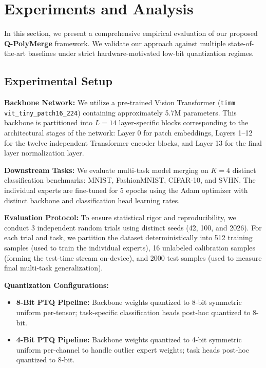 \section{Experiments and Analysis}
\label{sec:experiments}

In this section, we present a comprehensive empirical evaluation of our proposed \textbf{Q-PolyMerge} framework. We validate our approach against multiple state-of-the-art baselines under strict hardware-motivated low-bit quantization regimes.

\subsection{Experimental Setup}
\label{subsec:exp_setup}

\textbf{Backbone Network:} We utilize a pre-trained Vision Transformer (\texttt{timm} \texttt{vit\_tiny\_patch16\_224}) \cite{vaswani2017attention} containing approximately 5.7M parameters. This backbone is partitioned into $L=14$ layer-specific blocks corresponding to the architectural stages of the network: Layer 0 for patch embeddings, Layers 1--12 for the twelve independent Transformer encoder blocks, and Layer 13 for the final layer normalization layer.

\textbf{Downstream Tasks:} We evaluate multi-task model merging on $K=4$ distinct classification benchmarks: MNIST, FashionMNIST, CIFAR-10, and SVHN. The individual experts are fine-tuned for 5 epochs using the Adam optimizer with distinct backbone and classification head learning rates.

\textbf{Evaluation Protocol:} To ensure statistical rigor and reproducibility, we conduct 3 independent random trials using distinct seeds (42, 100, and 2026). For each trial and task, we partition the dataset deterministically into 512 training samples (used to train the individual experts), 16 unlabeled calibration samples (forming the test-time stream on-device), and 2000 test samples (used to measure final multi-task generalization).

\textbf{Quantization Configurations:}
\begin{itemize}
    \item \textbf{8-Bit PTQ Pipeline:} Backbone weights quantized to 8-bit symmetric uniform per-tensor; task-specific classification heads post-hoc quantized to 8-bit.
    \item \textbf{4-Bit PTQ Pipeline:} Backbone weights quantized to 4-bit symmetric uniform per-channel to handle outlier expert weights; task heads post-hoc quantized to 8-bit.
\end{itemize}

